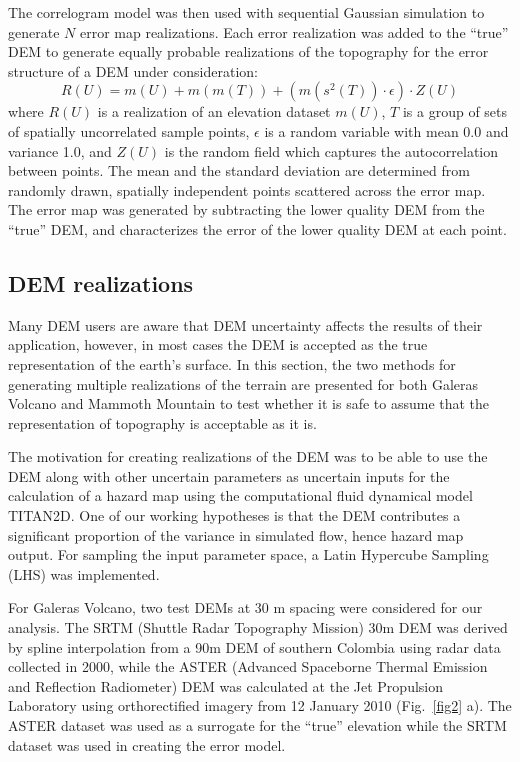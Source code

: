 \documentclass{article}
\begin{document}
The correlogram model was then used with sequential Gaussian
simulation to generate $N$ error map realizations.  Each error
realization was added to the ``true'' DEM to generate equally probable
realizations of the topography for the error structure of a DEM under
consideration:
\begin{equation}
 R(U)=m(U)+m(m(T))+(m(s^2(T))\cdot \epsilon)\cdot Z(U)
\label{eq:one}
\end{equation} 
where $R(U)$ is a realization of an elevation dataset $m(U)$, $T$ is a
group of sets of spatially uncorrelated sample points, $\epsilon$ is a
random variable with mean 0.0 and variance 1.0, and $Z(U)$ is the
random field which captures the autocorrelation between points.  The
mean and the standard deviation are determined from randomly drawn,
spatially independent points scattered across the error map. The error
map was generated by subtracting the lower quality DEM from the
``true'' DEM, and characterizes the error of the lower quality DEM at
each point.

\subsection{DEM realizations}
Many DEM users are aware that DEM uncertainty affects the results of
their application, however, in most cases the DEM is accepted as the
true representation of the earth's surface. In this section, the two
methods for generating multiple realizations of the terrain are
presented for both Galeras Volcano and Mammoth Mountain to test
whether it is safe to assume that the representation of topography is
acceptable as it is.

The motivation for creating realizations of the DEM was to be able to
use the DEM along with other uncertain parameters as uncertain inputs
for the calculation of a hazard map using the computational fluid
dynamical model TITAN2D.  One of our working hypotheses is that the
DEM contributes a significant proportion of the variance in simulated
flow, hence hazard map output.  For sampling the input parameter
space, a Latin Hypercube Sampling (LHS) was implemented.

For Galeras Volcano, two test DEMs at 30 m spacing were considered for
our analysis. The SRTM (Shuttle Radar Topography Mission) 30m DEM was
derived by spline interpolation from a 90m DEM of southern Colombia
using radar data collected in 2000, while the ASTER (Advanced
Spaceborne Thermal Emission and Reflection Radiometer) DEM was
calculated at the Jet Propulsion Laboratory using orthorectified
imagery from 12 January 2010 (Fig.~\ref{fig2} a).  The ASTER dataset
was used as a surrogate for the ``true'' elevation while the SRTM
dataset was used in creating the error model.
\end{document}
